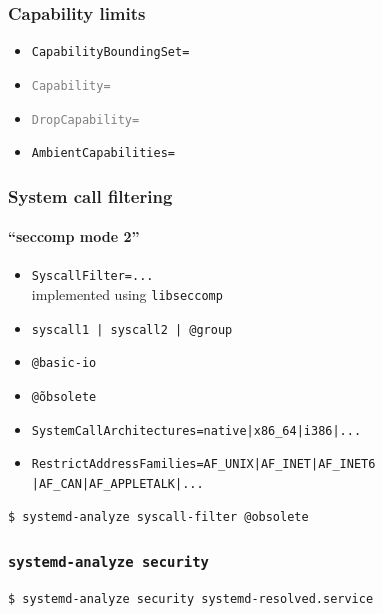 \documentclass[serif]{beamer}
\begin{document}
\begin{frame}
  \frametitle{Capability limits}

  \begin{itemize}
  \item \texttt{CapabilityBoundingSet=}
  \item \texttt{\textcolor{gray}{Capability=}}
  \item \texttt{\textcolor{gray}{DropCapability=}}
  \item \texttt{AmbientCapabilities=}
  \end{itemize}
\end{frame}

\begin{frame}[fragile]
  \frametitle{System call filtering}
  \framesubtitle{``seccomp mode 2''}

  \pause

  \begin{itemize}
  \item \texttt{SyscallFilter=...}\\
        implemented using \texttt{libseccomp}
  \item \texttt{syscall1 | syscall2 | @group}
  \item \texttt{@basic-io}
  \item \texttt{\~@obsolete}

  \medskip
  \pause

  \item \texttt{SystemCallArchitectures=native\color{gray}|x86\_64|i386|...}
  \item \texttt{RestrictAddressFamilies=AF\_UNIX|AF\_INET|AF\_INET6
        \color{gray}|AF\_CAN|AF\_APPLETALK|...}

  \end{itemize}

  \medskip
  \pause

  \begin{verbatim}
$ systemd-analyze syscall-filter @obsolete
  \end{verbatim}
\end{frame}

\begin{frame}[fragile]
  \frametitle{\texttt{systemd-analyze security}}

  \begin{verbatim}
$ systemd-analyze security systemd-resolved.service
  \end{verbatim}
\end{frame}
\end{document}
